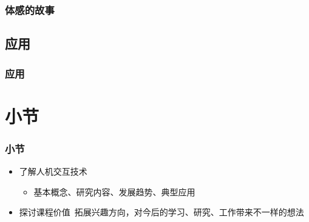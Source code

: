 \documentclass{beamer}
\begin{document}
\begin{frame}
	\frametitle{体感的故事}

\end{frame}

\subsection{应用}
\begin{frame}
	\frametitle{应用}

\end{frame}

\section{小节}
\begin{frame}
	\frametitle{小节}
	\begin{itemize}
		\item 了解人机交互技术
		\begin{itemize}
			\item {\small 基本概念、研究内容、发展趋势、典型应用}
		\end{itemize}
		\item 探讨课程价值~{\tiny 拓展兴趣方向，对今后的学习、研究、工作带来不一样的想法}
	\end{itemize}
\end{frame}
\end{document}
